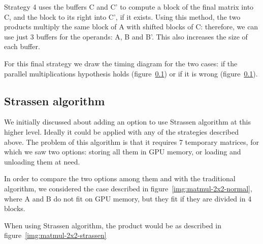 Strategy 4 uses the buffers C and C' to compute a block of the final matrix into C, and the block to its right into C', if it exists.
Using this method, the two products multiply the same block of A with shifted blocks of C: therefore, we can use just 3 buffers for the operands: A, B and B'.
This also increases the size of each buffer.

For this final strategy we draw the timing diagram for the two cases: if the parallel multiplications hypothesis holds (figure~\ref{}) or if it is wrong (figure~\ref{}).

\subsection{Strassen algorithm}

We initially discussed about adding an option to use Strassen algorithm at this higher level.
Ideally it could be applied with any of the strategies described above.
The problem of this algorithm is that it requires 7 temporary matrices, for which we saw two options: storing all them in GPU memory, or loading and unloading them at need.

In order to compare the two options among them and with the traditional algorithm, we considered the case described in figure~\ref{img:matmul-2x2-normal}, where A and B do not fit on GPU memory, but they fit if they are divided in 4 blocks.

When using Strassen algorithm, the product would be as described in figure~\ref{img:matmul-2x2-strassen}

